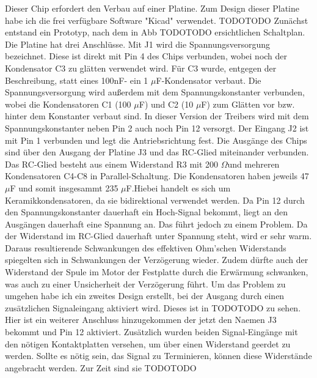 Dieser Chip erfordert den Verbau auf einer Platine. Zum Design dieser Platine habe ich die frei verfügbare Software "Kicad" verwendet. TODOTODO Zunächst entstand ein Prototyp, nach dem in Abb  TODOTODO ersichtlichen Schaltplan. Die Platine hat drei Anschlüsse. Mit J1 wird die Spannungsversorgung bezeichnet. Diese ist direkt mit Pin 4 des Chips verbunden, wobei noch der Kondensator C3 zu glätten verwendet wird. Für C3 wurde, entgegen der Beschreibung, statt eines 100nF- ein 1 \(\mu\)F-Kondensator verbaut. Die Spannungsversorgung wird außerdem mit dem Spannungskonstanter verbunden, wobei die Kondensatoren C1 (100 \(\mu\)F) und C2 (10 \(\mu\)F) zum Glätten vor bzw. hinter dem Konstanter verbaut sind. In dieser Version der Treibers wird mit dem Spannungskonstanter neben Pin 2 auch noch Pin 12 versorgt. Der Eingang J2 ist mit Pin 1 verbunden und legt die Antriebsrichtung fest. Die Ausgänge des Chips sind über den Ausgang der Platine J3 und das RC-Glied miteinander verbunden. Das RC-Glied besteht aus einem Widerstand R3 mit 200 \(\Omega\)und mehreren Kondensatoren C4-C8 in Parallel-Schaltung. Die Kondensatoren haben jeweils 47 \(\mu\)F und somit insgesammt 235 \(\mu\)F.Hiebei handelt es sich um Keramikkondensatoren, da sie bidirektional verwendet werden.
Da Pin 12 durch den Spannungskonstanter dauerhaft ein Hoch-Signal bekommt, liegt an den Ausgängen dauerhaft eine Spannung an. Das führt jedoch zu einem Problem. Da der Widerstand im RC-Glied dauerhaft unter Spannung steht, wird er sehr warm. Daraus resultierende Schwankungen des effektiven Ohm'schen Widerstands spiegelten sich in Schwankungen der Verzögerung wieder. Zudem dürfte auch der Widerstand der Spule im Motor der Festplatte durch die Erwärmung schwanken, was auch zu einer Unsicherheit der Verzögerung führt. Um das Problem zu umgehen habe ich ein zweites Design erstellt, bei der Ausgang durch einen zusätzlichen Signaleingang aktiviert wird.
Dieses ist in TODOTODO zu sehen.
Hier ist ein weiterer Anschluss hinzugekommen der jetzt den Naemen J3 bekommt und Pin 12 aktiviert. Zusätzlich wurden beiden Signal-Eingänge mit den nötigen Kontaktplatten versehen, um über einen Widerstand geerdet zu werden. Sollte es nötig sein, das Signal zu Terminieren, können diese Widerstände angebracht werden. Zur Zeit sind sie TODOTODO